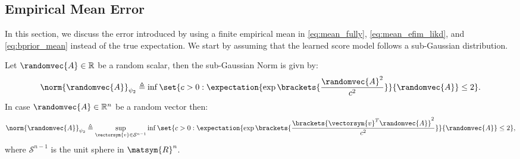 \subsection{Empirical Mean Error}
In this section, we discuss the error introduced by using a finite empirical mean in \eqref{eq:mean_fully}, \eqref{eq:mean_efim_likd}, and \eqref{eq:bprior_mean} instead of the true expectation. We start by assuming that the learned score model follows a sub-Gaussian distribution. 
\begin{definition}
    Let $\randomvec{A}\in\mathbb{R}$ be a random scalar, then the sub-Gaussian Norm is givn by:
    $$\norm{\randomvec{A}}_{\psi_2}\triangleq\inf\set{c>0: \expectation{\exp{\brackets{\frac{\randomvec{A}^2}{c^2}}}}{\randomvec{A}} \leq 2}.$$
    In case $\randomvec{A}\in\mathbb{R}^n$ be a random vector then:
$$\norm{\randomvec{A}}_{\psi_2}\triangleq\sup\limits_{\vectorsym{v}\in\mathcal{S}^{n-1}}\inf\set{c>0: \expectation{\exp{\brackets{\frac{\brackets{\vectorsym{v}^T\randomvec{A}}^2}{c^2}}}}{\randomvec{A}} \leq 2},$$
   where $\mathcal{S}^{n-1}$ is the unit sphere in $\matsym{R}^n$.
    
\end{definition}


